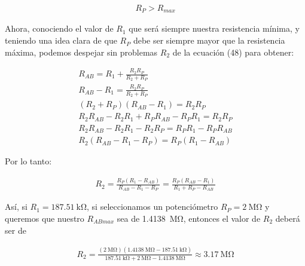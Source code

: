 \documentclass{article}
\begin{document}
\begin{align}
	R_P > R_{max}
\end{align}

Ahora, conociendo el valor de $R_1$ que será siempre nuestra resistencia mínima, y teniendo una idea clara de que $R_P$ debe ser siempre mayor que la resistencia máxima, podemos despejar sin problemas $R_2$ de la ecuación (48) para obtener:

\begin{align}
	R_{AB} = R_1 + \frac{R_2R_P}{R_2 + R_P} \nonumber \\
	R_{AB} - R_1 = \frac{R_2R_P}{R_2 + R_P} \nonumber \\
	(R_2 + R_P)(R_{AB} - R_1) = R_2R_P \nonumber \\
	R_2R_{AB} - R_2R_1 + R_PR_{AB} - R_PR_1 = R_2R_P \nonumber \\
	R_2R_{AB} - R_2R_1 - R_2R_P = R_PR_1 - R_PR_{AB} \nonumber \\
	R_2 (R_{AB} - R_1 - R_P) = R_P(R_1 -R_{AB}) \nonumber
\end{align}

Por lo tanto:

\begin{align}
	R_2 = \frac{R_P(R_1 -R_{AB})}{R_{AB} - R_1 - R_P} = \frac{R_P(R_{AB} - R_1)}{  R_1 + R_P - R_{AB}}
\end{align}

Así, si $R_1 = \qty{187.51}{\kilo \ohm}$, si seleccionamos un potenciómetro $R_P = \qty{2}{\mega \ohm}$ y queremos que nuestro $R_{ABmax}$ sea de \qty{1.4138}{\mega \ohm}, entonces el valor de $R_2$ deberá ser de

\begin{align}
	R_2 = \frac{(\qty{2}{\mega \ohm})( \qty{1.4138}{\mega \ohm} - \qty{187.51}{\kilo \ohm})}{\qty{187.51}{\kilo \ohm} + \qty{2}{\mega \ohm} - \qty{1.4138}{\mega \ohm}} \approx \qty{3.17}{\mega \ohm}
\end{align}
\end{document}
